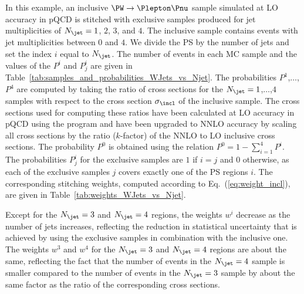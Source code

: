 In this example, an inclusive $\PW \to \Plepton\Pnu$ sample simulated at LO accuracy in pQCD 
is stitched with exclusive samples produced for jet multiplicities of $N_{\jet} = 1$, $2$, $3$, and $4$.
The inclusive sample contains events with jet multiplicities between $0$ and $4$.
We divide the PS by the number of jets and set the index $i$ equal to $N_{\jet}$.
The number of events in each MC sample and the values of the $P^{i}$ and $P_{j}^{i}$ are given in Table~\ref{tab:samples_and_probabilities_WJets_vs_Njet}.
The probabilities $P^{1}$,$\ldots$,$P^{4}$ are computed by taking the ratio of cross sections 
for the $N_{\jet} = 1$,$\ldots$,$4$ samples with respect to the cross section $\sigma_{\incl}$ of the inclusive sample.
The cross sections used for computing these ratios have been calculated at LO accuracy in pQCD using the program \MGvATNLO
and have been upgraded to NNLO accuracy by scaling all cross sections by the ratio ($k$-factor) of the NNLO to LO inclusive cross sections.
The probability $P^{0}$ is obtained using the relation $P^{0} = 1 - \sum_{i=1}^{4} P^{i}$.
The probabilities $P_{j}^{i}$ for the exclusive samples are $1$ if $i=j$ and $0$ otherwise,
as each of the exclusive samples $j$ covers exactly one of the PS regions $i$.
The corresponding stitching weights, computed according to Eq.~(\ref{eq:weight_incl}), are given in Table~\ref{tab:weights_WJets_vs_Njet}.

Except for the $N_{\jet} = 3$ and $N_{\jet} = 4$ regions,
the weights $w^{i}$ decrease as the number of jets increases, 
reflecting the reduction in statistical uncertainty that is achieved by using the exclusive samples in combination with the inclusive one.
The weights $w^{3}$ and $w^{4}$ for the $N_{\jet} = 3$ and $N_{\jet} = 4$ regions are about the same,
reflecting the fact that the number of events in the $N_{\jet} = 4$ sample is smaller compared to the number of events in the $N_{\jet} = 3$ sample
by about the same factor as the ratio of the corresponding cross sections.

